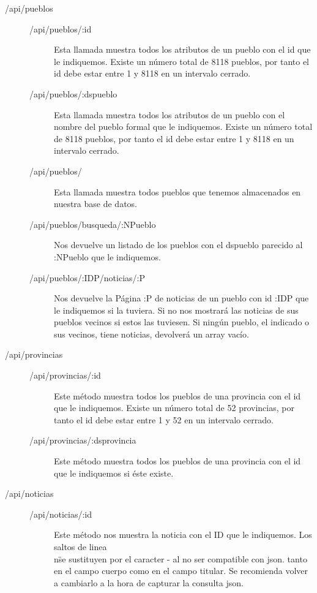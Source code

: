 \begin{description}

\item[/api/pueblos]
\begin{description}
\item[/api/pueblos/:id]
Esta llamada muestra todos los atributos de un pueblo con el id que le indiquemos. Existe un número total de 8118 pueblos, por tanto el id debe estar entre 1 y 8118 en un intervalo cerrado.

\item[/api/pueblos/:dspueblo]
Esta llamada muestra todos los atributos de un pueblo con el nombre del pueblo formal que le indiquemos. Existe un número total de 8118 pueblos, por tanto el id debe estar entre 1 y 8118 en un intervalo cerrado.

\item[/api/pueblos/]
Esta llamada muestra todos pueblos que tenemos almacenados en nuestra base de datos.

\item[/api/pueblos/busqueda/:NPueblo]
Nos devuelve un listado de los pueblos con el dspueblo parecido al :NPueblo que le indiquemos.

\item[/api/pueblos/:IDP/noticias/:P] 
Nos devuelve la Página :P de noticias de un pueblo con id :IDP que le indiquemos si la tuviera. Si no nos mostrará las noticias de sus pueblos vecinos si estos las tuviesen. Si ningún pueblo, el indicado o sus vecinos, tiene noticias, devolverá un array vacío.

\end{description}

\item[/api/provincias]
\begin{description}
\item[/api/provincias/:id]
Este método muestra todos los pueblos de una provincia con el id que le indiquemos. Existe un número total de 52 provincias, por tanto el id debe estar entre 1 y 52 en un intervalo cerrado.

\item[/api/provincias/:dsprovincia]
Este método muestra todos los pueblos de una provincia con el id que le indiquemos si éste existe.

\end{description}


\item[/api/noticias]
\begin{description}
\item[/api/noticias/:id]
Este método nos muestra la noticia con el ID que le indiquemos. Los saltos de linea \"\\n\" se sustituyen por el caracter - al no ser compatible con json. tanto en el campo cuerpo como en el campo titular. Se recomienda volver a cambiarlo a la hora de capturar la consulta json.


\end{description}
\end{description}
